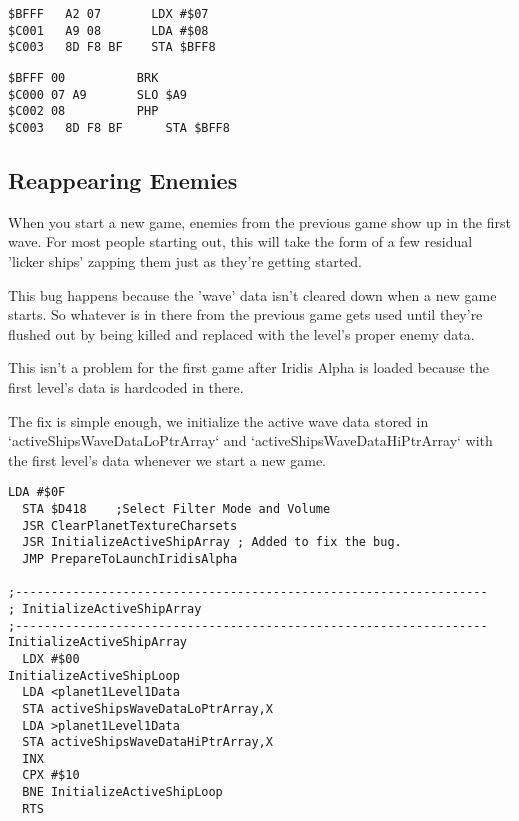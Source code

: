 \begin{lstlisting}[caption=The data segment as it should be\, with \icode{\$A2} at \icode{\$BFFF}]
$BFFF	A2 07       LDX #$07
$C001	A9 08       LDA #$08
$C003	8D F8 BF    STA $BFF8
\end{lstlisting}

\begin{lstlisting}[caption=The corrupt byte\, with \icode{\$00} at \icode{\$BFFF}]
$BFFF 00          BRK
$C000 07 A9       SLO $A9
$C002 08          PHP
$C003	8D F8 BF	  STA $BFF8
\end{lstlisting}

\subsection{Reappearing Enemies}

When you start a new game, enemies from the previous game show up in the first
wave. For most people starting out, this will take the form of a few residual
'licker ships' zapping them just as they're getting started.

This bug happens because the 'wave' data isn't cleared down when a new game
starts. So whatever is in there from the previous game gets used until they're
flushed out by being killed and replaced with the level's proper enemy data.

This isn't a problem for the first game after Iridis Alpha is loaded because
the first level's data is hardcoded in there.

The fix is simple enough, we initialize the active wave data stored in `activeShipsWaveDataLoPtrArray` and `activeShipsWaveDataHiPtrArray`
with the first level's data whenever we start a new game. 

\begin{lstlisting}[caption=Fixing the reappearing enemy bug]
  LDA #$0F 
  STA $D418    ;Select Filter Mode and Volume 
  JSR ClearPlanetTextureCharsets 
  JSR InitializeActiveShipArray ; Added to fix the bug.
  JMP PrepareToLaunchIridisAlpha 

;------------------------------------------------------------------ 
; InitializeActiveShipArray 
;------------------------------------------------------------------ 
InitializeActiveShipArray 
  LDX #$00 
InitializeActiveShipLoop 
  LDA <planet1Level1Data 
  STA activeShipsWaveDataLoPtrArray,X 
  LDA >planet1Level1Data 
  STA activeShipsWaveDataHiPtrArray,X 
  INX 
  CPX #$10 
  BNE InitializeActiveShipLoop 
  RTS 
\end{lstlisting}

